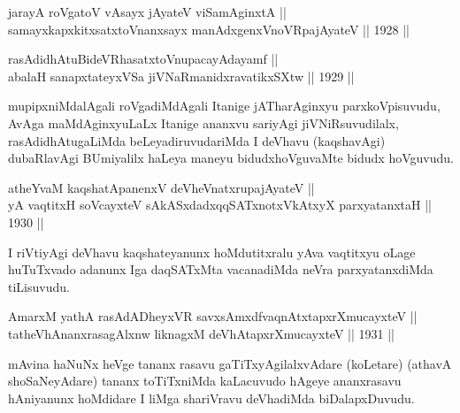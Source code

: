 
\begin{shl}
jarayA roVgatoV vA\s sayx jAyateV viSamAginxtA || \\
samayxkapxkitxsatxtoV\s nanxsayx manAdxgenxVnoVRpajAyateV ||  1928 || 
\end{shl}

\begin{shl}
rasAdidhAtuBideVRhasatxtoV\s nupacayAdayamf || \\
abalaH sanapxtateyxVSa jiVNaRmanidxravatikxSXtw ||  1929 ||  
\end{shl}

\begin{artha}
mupipxniMdalAgali roVgadiMdAgali Itanige jATharAginxyu
parxkoVpisuvudu, AvAga maMdAginxyuLaLx Itanige ananxvu sariyAgi
jiVNiRsuvudilalx, rasAdidhAtugaLiMda beLeyadiruvudariMda I deVhavu
(kaqshavAgi) dubaRlavAgi BUmiyalilx haLeya maneyu bidudxhoVguvaMte
bidudx hoVguvudu.
\end{artha}


\begin{shl}
atheYvaM kaqshatApanenxV deVheV\s natxrupajAyateV ||  \\
yA vaqtitxH soVcayxteV sAkASxdadxqqSATxnotxVkAtxyX parxyatanxtaH ||  1930 ||  
\end{shl}

\begin{artha}
I riVtiyAgi deVhavu kaqshateyanunx hoMdutitxralu yAva vaqtitxyu oLage
huTuTxvado adanunx Iga daqSATxMta vacanadiMda neVra parxyatanxdiMda
tiLisuvudu.
\end{artha}

\begin{shl}
AmarxM yathA rasAdADheyxVR savxsAmxdfvaqnAtxtapxrXmucayxteV || \\
tatheVhAnanxrasagAlxnw liknagxM deVhAtapxrXmucayxteV ||  1931 ||  
\end{shl}

\begin{artha}
mAvina haNuNx heVge tananx rasavu gaTiTxyAgilalxvAdare (koLetare)
(athavA shoSaNeyAdare) tananx toTiTxniMda kaLacuvudo hAgeye
ananxrasavu hAniyanunx hoMdidare I liMga shariVravu deVhadiMda
biDalapxDuvudu.
\end{artha}


